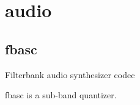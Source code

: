 \section{audio}

\subsection{fbasc}
Filterbank audio synthesizer codec

fbasc is a sub-band quantizer.

